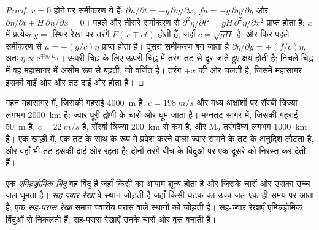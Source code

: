 \begin{proof}
$v = 0$ होने पर समीकरण ये हैं: $\partial u/\partial t = -g\,\partial\eta/
\partial x$, $fu = -g\,\partial\eta/\partial y$ और $\partial\eta/\partial t
+ H\,\partial u/\partial x = 0$। पहले और तीसरे समीकरण से $\partial^2
\eta/\partial t^2 = gH\,\partial^2\eta/\partial x^2$ प्राप्त होता है: $x$ में प्रत्येक
$y = $ स्थिर रेखा पर तरंगें $F(x \mp ct)$ होती हैं, जहाँ $c = \sqrt{gH}$ है, और फिर
पहले समीकरण से $u = \pm(g/c)\eta$ प्राप्त होता है। दूसरा समीकरण बन जाता है $\partial\eta/
\partial y = \mp(f/c)\eta$, अतः $\eta \propto \mathrm e^{\mp y/L_R}$। ऊपरी चिह्न के लिए
ऊपरी चिह्न में तरंग तट से दूर जाते हुए क्षय होती है; निचले चिह्न में वह
महासागर में असीम रूप से बढ़ती, जो वर्जित है। तरंग
$+x$ की ओर चलती है, जिसमें महासागर इसकी बाईं ओर और तट दाईं ओर होता है।
\end{proof}

गहन महासागर में, जिसकी गहराई \qty{4000}{m} है, $c = \qty{198}{m/s}$ और
मध्य अक्षांशों पर रॉस्बी त्रिज्या लगभग \qty{2000}{km} है: ज्वार
पूरी द्रोणी के चारों ओर घूम जाता है। मग्नतट सागर में, जिसकी गहराई \qty{50}{m} है, $c =
\qty{22}{m/s}$ है, रॉस्बी त्रिज्या \qty{200}{km} से कम है, और M$_2$
तरंगदैर्घ्य लगभग \qty{1000}{km} है। एक खाड़ी में, एक तट के साथ  के रूप में प्रवेश करने वाला ज्वार
सामने के तट के अनुदिश लौटता है, और वहाँ भी तट इसकी दाईं ओर रहता है;
दोनों तरंगें बीच के बिंदुओं पर एक-दूसरे को निरस्त कर देती हैं।

\begin{definition}[एम्फ़िड्रोमिक बिंदु; सह-ज्वार रेखा; सह-परास रेखा]\label{def:b3:ocean-dynamics:amphidrome}
एक \emph{एम्फ़िड्रोमिक बिंदु} वह बिंदु है जहाँ
किसी  का आयाम शून्य होता है और जिसके चारों ओर उसका उच्च जल
घूमता है। \emph{सह-ज्वार रेखा} वे स्थान जोड़ती है जहाँ किसी
घटक का उच्च जल एक ही समय पर आता है; एक \emph{सह-परास
रेखा} समान ज्वारीय परास वाले स्थानों को जोड़ती है। सह-ज्वार
रेखाएँ एम्फ़िड्रोमिक बिंदुओं से निकलती हैं; सह-परास रेखाएँ उनके चारों ओर वृत्त बनाती हैं।
\end{definition}

